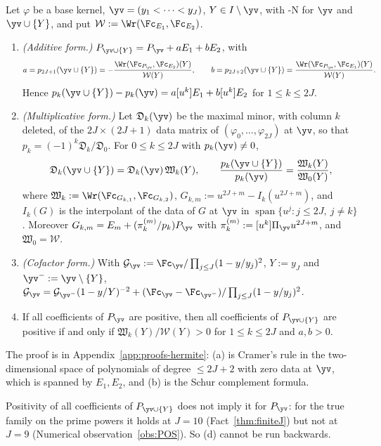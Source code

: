 \begin{lemma}\label{lem:nodeadd}
Let $\varphi$ be a base kernel, $\yv=(y_1<\dots<y_J)$, $Y\in I\setminus\yv$, with \hyp{N} for $\yv$ and $\yv\cup\{Y\}$,
and put $\mathcal W:=\Wr(\Fc_{E_1},\Fc_{E_2})$.
\begin{enumerate}[label=(\alph*),leftmargin=2em]
\item \emph{(Additive form.)} $P_{\yv\cup\{Y\}}=P_{\yv}+aE_1+bE_2$, with
\[
a=p_{2J+1}(\yv\cup\{Y\})=-\frac{\Wr(\Fc_{P_{\yv}},\Fc_{E_2})(Y)}{\mathcal W(Y)},\qquad
b=p_{2J+2}(\yv\cup\{Y\})=\frac{\Wr(\Fc_{P_{\yv}},\Fc_{E_1})(Y)}{\mathcal W(Y)}.
\]
Hence
$p_k(\yv\cup\{Y\})-p_k(\yv)=a[u^k]E_1+b[u^k]E_2$ for $1\le k\le2J$.
\item \emph{(Multiplicative form.)} Let $\mathfrak D_k(\yv)$ be the maximal minor, with column $k$ deleted, of
the $2J\times(2J+1)$ data matrix of $(\varphi_0,\dots,\varphi_{2J})$ at $\yv$, so that
$p_k=(-1)^k\mathfrak D_k/\mathfrak D_0$. For $0\le k\le2J$ with $p_k(\yv)\ne0$,
\[
\mathfrak D_k(\yv\cup\{Y\})=\mathfrak D_k(\yv)\,\mathfrak W_k(Y),\qquad
\frac{p_k(\yv\cup\{Y\})}{p_k(\yv)}=\frac{\mathfrak W_k(Y)}{\mathfrak W_0(Y)},
\]
where $\mathfrak W_k:=\Wr(\Fc_{G_{k,1}},\Fc_{G_{k,2}})$, $G_{k,m}:=u^{2J+m}-I_k(u^{2J+m})$, and $I_k(G)$ is the
interpolant of the data of $G$ at $\yv$ in $\operatorname{span}\{u^j:j\le2J,\ j\ne k\}$. Moreover
$G_{k,m}=E_m+(\pi_k^{(m)}/p_k)P_{\yv}$ with $\pi_k^{(m)}:=[u^k]\Pi_{\yv}u^{2J+m}$, and $\mathfrak W_0=\mathcal W$.
\item \emph{(Cofactor form.)} With $\mathcal G_{\yv}:=\Fc_{\yv}/\prod_{j\le J}(1-y/y_j)^2$, $Y:=y_J$ and
$\yv^-:=\yv\setminus\{Y\}$,
$\mathcal G_{\yv}=\mathcal G_{\yv^-}(1-y/Y)^{-2}+(\Fc_{\yv}-\Fc_{\yv^-})/\prod_{j\le J}(1-y/y_j)^2$.
\item If all coefficients of $P_{\yv}$ are positive, then all coefficients of $P_{\yv\cup\{Y\}}$ are positive if and
only if $\mathfrak W_k(Y)/\mathcal W(Y)>0$ for $1\le k\le2J$ and $a,b>0$.
\end{enumerate}
\end{lemma}

The proof is in Appendix~\ref{app:proofs-hermite}: (a) is Cramer's rule in the two-dimensional space of polynomials
of degree $\le2J+2$ with zero data at $\yv$, which is spanned by $E_1,E_2$, and (b) is the Schur complement formula.

Positivity of all coefficients of $P_{\yv\cup\{Y\}}$ does not imply it for $P_{\yv}$: for the true family on the
prime powers it holds at $J=10$ (Fact~\ref{thm:finiteJ}) but not at $J=9$ (Numerical
observation~\ref{obs:POS}). So (d) cannot be run backwards.

